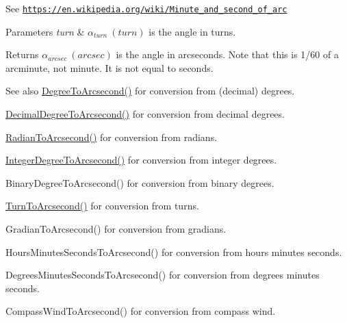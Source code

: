 See \href{https://en.wikipedia.org/wiki/Minute_and_second_of_arc}{\tt https\+://en.\+wikipedia.\+org/wiki/\+Minute\+\_\+and\+\_\+second\+\_\+of\+\_\+arc} 
\begin{DoxyParams}{Parameters}
{\em turn} & $\alpha_{turn}\ (turn)$ is the angle in turns. \\
\hline
\end{DoxyParams}
\begin{DoxyReturn}{Returns}
$\alpha_{arcsec}\ (arcsec)$ is the angle in arcseconds. Note that this is 1/60 of a arcminute, not minute. It is not equal to seconds. 
\end{DoxyReturn}
\begin{DoxySeeAlso}{See also}
\mbox{\hyperlink{group___e_g_x_math-_angle_conversions-_degree_gaf85e2d765c248f447854a807a68a5de8}{Degree\+To\+Arcsecond()}} for conversion from (decimal) degrees. 

\mbox{\hyperlink{group___e_g_x_math-_angle_conversions-_decimal_degree_gab9d5635a6e35127b5245978aba508962}{Decimal\+Degree\+To\+Arcsecond()}} for conversion from decimal degrees. 

\mbox{\hyperlink{group___e_g_x_math-_angle_conversions-_radian_ga2f952f6675a0fc54bf72bfe4e3d2664a}{Radian\+To\+Arcsecond()}} for conversion from radians. 

\mbox{\hyperlink{group___e_g_x_math-_angle_conversions-_integer_degree_gaa04058a2fea3dc3678264a05fac6e1ae}{Integer\+Degree\+To\+Arcsecond()}} for conversion from integer degrees. 

Binary\+Degree\+To\+Arcsecond() for conversion from binary degrees. 

\mbox{\hyperlink{group___e_g_x_math-_angle_conversions-_turn_gaad072969abc59ef6f5b63ac6a176a11b}{Turn\+To\+Arcsecond()}} for conversion from turns. 

Gradian\+To\+Arcsecond() for conversion from gradians. 

Hours\+Minutes\+Seconds\+To\+Arcsecond() for conversion from hours minutes seconds. 

Degrees\+Minutes\+Seconds\+To\+Arcsecond() for conversion from degrees minutes seconds. 

Compass\+Wind\+To\+Arcsecond() for conversion from compass wind. 
\end{DoxySeeAlso}
\mbox{\label{group___e_g_x_math-_angle_conversions-_turn_ga678efb8f5c3958351fc3f1dfaf117b28}} 
